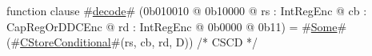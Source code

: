 function clause #\hyperref[zdecode]{decode}# (0b010010 @ 0b10000 @ rs : IntRegEnc @ cb : CapRegOrDDCEnc @ rd : IntRegEnc @ 0b0000 @ 0b11) = #\hyperref[zSome]{Some}#(#\hyperref[zCStoreConditional]{CStoreConditional}#(rs, cb, rd, D)) /* CSCD */
